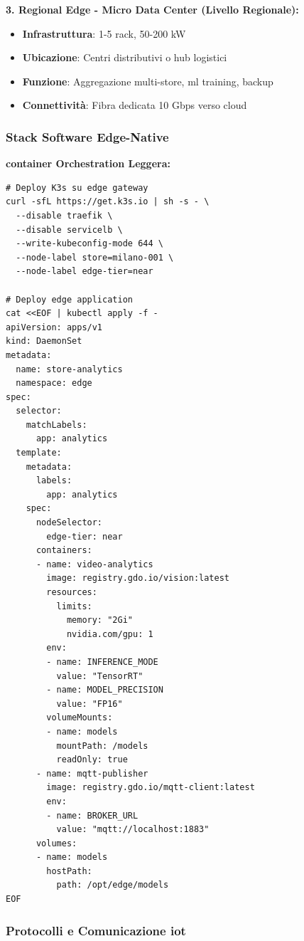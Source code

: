 \textbf{3. Regional Edge - Micro Data Center (Livello Regionale):}
\begin{itemize}
    \item \textbf{Infrastruttura}: 1-5 rack, 50-200 kW
    \item \textbf{Ubicazione}: Centri distributivi o hub logistici
    \item \textbf{Funzione}: Aggregazione multi-store, \gls{ml} training, backup
    \item \textbf{Connettività}: Fibra dedicata 10 Gbps verso cloud
\end{itemize}

\subsubsection{\texorpdfstring{Stack Software Edge-Native}{3.3.2.2 - Stack Software Edge-Native}}

\textbf{\gls{container} Orchestration Leggera:}
\begin{lstlisting}[caption={K3s Deployment per Edge Store},label={lst:k3s_edge}]
# Deploy K3s su edge gateway
curl -sfL https://get.k3s.io | sh -s - \
  --disable traefik \
  --disable servicelb \
  --write-kubeconfig-mode 644 \
  --node-label store=milano-001 \
  --node-label edge-tier=near

# Deploy edge application
cat <<EOF | kubectl apply -f -
apiVersion: apps/v1
kind: DaemonSet
metadata:
  name: store-analytics
  namespace: edge
spec:
  selector:
    matchLabels:
      app: analytics
  template:
    metadata:
      labels:
        app: analytics
    spec:
      nodeSelector:
        edge-tier: near
      containers:
      - name: video-analytics
        image: registry.gdo.io/vision:latest
        resources:
          limits:
            memory: "2Gi"
            nvidia.com/gpu: 1
        env:
        - name: INFERENCE_MODE
          value: "TensorRT"
        - name: MODEL_PRECISION
          value: "FP16"
        volumeMounts:
        - name: models
          mountPath: /models
          readOnly: true
      - name: mqtt-publisher
        image: registry.gdo.io/mqtt-client:latest
        env:
        - name: BROKER_URL
          value: "mqtt://localhost:1883"
      volumes:
      - name: models
        hostPath:
          path: /opt/edge/models
EOF
\end{lstlisting}

\subsubsection{\texorpdfstring{Protocolli e Comunicazione \gls{iot}}{3.3.2.3 - Protocolli e Comunicazione IoT}}

